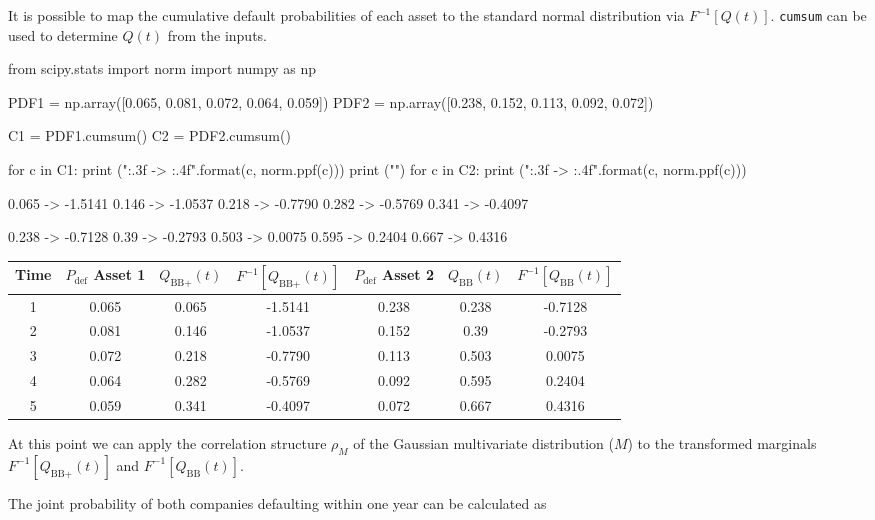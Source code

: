 \cprotEnv\begin{solution}
It is possible to map the cumulative default probabilities of each asset to the standard normal distribution via $F^{-1}[Q(t)]$.
\texttt{cumsum} can be used to determine $Q(t)$ from the inputs.

\begin{ipython}
from scipy.stats import norm
import numpy as np

PDF1 = np.array([0.065, 0.081, 0.072, 0.064, 0.059])
PDF2 = np.array([0.238, 0.152, 0.113, 0.092, 0.072])

C1 = PDF1.cumsum()
C2 = PDF2.cumsum()

for c in C1:
    print ("{:.3f} -> {:.4f}".format(c, norm.ppf(c)))
print ("")
for c in C2:
    print ("{:.3f} -> {:.4f}".format(c, norm.ppf(c)))
\end{ipython}
\begin{ioutput}
0.065 -> -1.5141
0.146 -> -1.0537
0.218 -> -0.7790
0.282 -> -0.5769
0.341 -> -0.4097

0.238 -> -0.7128
0.39 -> -0.2793
0.503 -> 0.0075
0.595 -> 0.2404
0.667 -> 0.4316
\end{ioutput}

\begin{table}[htbp]
\centering
\begin{tabular}{|c|c|c|c|c|c|c|}
\hline
Time & $P_{\mathrm{def}}$ Asset 1 & $Q_{\textrm{BB+}}(t)$ & $F^{-1}[Q_{\textrm{BB+}}(t)]$ & $P_{\mathrm{def}}$ Asset 2 & $Q_{\textrm{BB}}(t)$ & $F^{-1}[Q_{\textrm{BB}}(t)]$\\[5 pt]
\hline
\hline
1 & 0.065 & 0.065 & -1.5141 & 0.238 & 0.238 & -0.7128\\
2 & 0.081 & 0.146 & -1.0537 & 0.152 & 0.39 & -0.2793\\
3 & 0.072 & 0.218 & -0.7790 & 0.113 & 0.503 & 0.0075\\
4 & 0.064 & 0.282 & -0.5769 & 0.092 & 0.595 & 0.2404\\
5 & 0.059 & 0.341 & -0.4097 & 0.072 & 0.667 & 0.4316\\
\hline
\end{tabular}
\end{table}

At this point we can apply the correlation structure $\rho_M$ of the Gaussian multivariate distribution ($M$) to the transformed marginals $F^{-1}[Q_{\textrm{BB+}}(t)]$ and $F^{-1}[Q_{\textrm{BB}}(t)]$.

The joint probability of both companies defaulting within one year can be calculated as


\end{solution}
